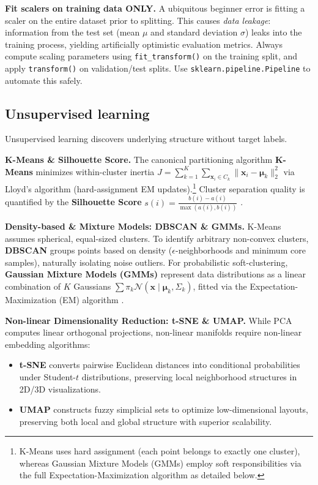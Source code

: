 \documentclass[11pt,a4paper]{article}
\begin{document}
	\begin{ethicsbox}
		\textbf{Fit scalers on training data ONLY.} A ubiquitous beginner error is fitting a scaler on the entire dataset prior to splitting. This causes \emph{data leakage}: information from the test set (mean $\mu$ and standard deviation $\sigma$) leaks into the training process, yielding artificially optimistic evaluation metrics. Always compute scaling parameters using \texttt{fit\_transform()} on the training split, and apply \texttt{transform()} on validation/test splits. Use \texttt{sklearn.pipeline.Pipeline} to automate this safely.
	\end{ethicsbox}

	\subsection{Unsupervised learning}
	
	Unsupervised learning discovers underlying structure without target labels.
	
	\textbf{K-Means \& Silhouette Score.} The canonical partitioning algorithm \textbf{K-Means} \parencite{macqueen1967} minimizes within-cluster inertia $J = \sum_{k=1}^K \sum_{\mathbf{x}_i \in C_k} \|\mathbf{x}_i - \boldsymbol{\mu}_k\|_2^2$ via Lloyd's algorithm (hard-assignment EM updates).\footnote{K-Means uses hard assignment (each point belongs to exactly one cluster), whereas Gaussian Mixture Models (GMMs) employ soft responsibilities via the full Expectation-Maximization algorithm as detailed below.} Cluster separation quality is quantified by the \textbf{Silhouette Score} $s(i) = \frac{b(i)-a(i)}{\max(a(i), b(i))}$ \parencite{rousseeuw1987}.
	
	\textbf{Density-based \& Mixture Models: DBSCAN \& GMMs.} K-Means assumes spherical, equal-sized clusters. To identify arbitrary non-convex clusters, \textbf{DBSCAN} \parencite{ester1996} groups points based on density ($\epsilon$-neighborhoods and minimum core samples), naturally isolating noise outliers. For probabilistic soft-clustering, \textbf{Gaussian Mixture Models (GMMs)} represent data distributions as a linear combination of $K$ Gaussians $\sum \pi_k \mathcal{N}(\mathbf{x} \mid \boldsymbol{\mu}_k, \Sigma_k)$, fitted via the Expectation-Maximization (EM) algorithm \parencite{bishop2006}.
	
	\textbf{Non-linear Dimensionality Reduction: t-SNE \& UMAP.} While PCA computes linear orthogonal projections, non-linear manifolds require non-linear embedding algorithms:
	\begin{itemize}[nosep]
		\item \textbf{t-SNE} \parencite{vanDerMaaten2008} converts pairwise Euclidean distances into conditional probabilities under Student-$t$ distributions, preserving local neighborhood structures in 2D/3D visualizations.
		\item \textbf{UMAP} \parencite{mcinnes2018} constructs fuzzy simplicial sets to optimize low-dimensional layouts, preserving both local and global structure with superior scalability.
	\end{itemize}
\end{document}
